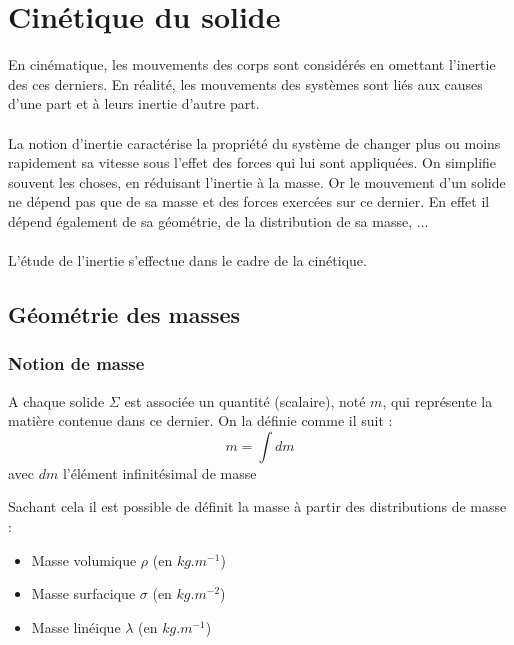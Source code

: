 \chapter{Cinétique du solide}
En cinématique, les mouvements des corps sont considérés en omettant l'inertie des ces derniers.
En réalité, les mouvements des systèmes sont liés aux causes d'une part et à leurs inertie d'autre part.\\
\\
La notion d'inertie caractérise la propriété du système de changer plus ou moins rapidement sa vitesse sous l'effet des forces qui lui sont appliquées.
On simplifie souvent les choses, en réduisant l'inertie à la masse. Or le mouvement d'un solide ne dépend pas que de sa masse et des forces exercées sur ce dernier.
En effet il dépend également de sa géométrie, de la distribution de sa masse, ...
\\
\\
L'étude de l'inertie s'effectue dans le cadre de la cinétique.
\section{Géométrie des masses}
\subsection{Notion de masse}
\begin{defi}
A chaque solide $\Sigma$ est associée un quantité (scalaire), noté $m$, qui représente la matière contenue dans ce dernier. On la définie comme il suit :
$$m=\int dm$$
avec $dm$ l'élément infinitésimal de masse
\end{defi}
Sachant cela il est possible de définit la masse à partir des distributions de masse :
\begin{itemize}
    \item Masse volumique $\rho$ (en $kg.m^{-1}$)
    \item Masse surfacique $\sigma$ (en $kg.m^{-2}$)
    \item Masse linéique $\lambda$ (en $kg.m^{-1}$)
\end{itemize}

